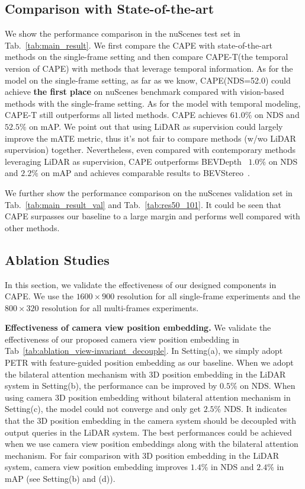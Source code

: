 \documentclass[10pt,twocolumn,letterpaper]{article}
\newcommand{\ourMethod}{CAPE}
\newcommand{\highNDS}{$61.0\%$}
\newcommand{\highmAP}{$52.5\%$}
\begin{document}
\subsection{Comparison with State-of-the-art}
We show the performance comparison in the nuScenes test set in Tab.~\ref{tab:main_result}. We first compare the \ourMethod{} with state-of-the-art methods on the single-frame setting and then compare \ourMethod{}-T(the temporal version of \ourMethod{}) with methods that leverage temporal information. 
As for the model on the single-frame setting, as far as we know, \ourMethod{}(NDS=52.0) could achieve \textbf{the first place} on nuScenes benchmark compared with vision-based methods with the single-frame setting.
As for the model with temporal modeling, \ourMethod{}-T still outperforms all listed methods. \ourMethod{} achieves \highNDS{} on NDS and \highmAP{} on mAP. We point out that using LiDAR as supervision could largely improve the mATE metric, thus it's not fair to compare methods (w/wo LiDAR supervision) together. Nevertheless, even compared with contemporary methods leveraging LiDAR as supervision, \ourMethod{} outperforms BEVDepth~\cite{li2022bevdepth} $1.0\%$ on NDS and $2.2\%$ on mAP and achieves comparable results to BEVStereo~\cite{li2022bevstereo}. 


We further show the performance comparison on the nuScenes validation set in Tab.~\ref{tab:main_result_val} and Tab.~\ref{tab:res50_101}. It could be seen that \ourMethod{} surpasses our baseline to a large margin and performs well compared with other methods. 


\subsection{Ablation Studies} In this section, we validate the effectiveness of our designed components in \ourMethod{}.
We use the $1600 \times 900$ resolution for all single-frame experiments and the $800 \times 320$ resolution for all multi-frames experiments.





\vspace{2mm}
\noindent\textbf{Effectiveness of camera view position embedding.} We validate the effectiveness of our proposed camera view position embedding in Tab~\ref{tab:ablation_view-invariant_decouple}. In Setting(a), we simply adopt PETR with feature-guided position embedding as our baseline. When we adopt the bilateral attention mechanism with 3D position embedding in the LiDAR system in Setting(b), the performance can be improved by $0.5\%$ on NDS. When using camera 3D position embedding without bilateral attention mechanism in Setting(c), the model could not converge and only get $2.5\%$ NDS. It indicates that the 3D position embedding in the camera system should be decoupled with output queries in the LiDAR system. The best performances could be achieved when we use camera view position embeddings along with the bilateral attention mechanism.
For fair comparison with 3D position embedding in the LiDAR system, camera view position embedding improves $1.4\%$ in NDS and $2.4\%$ in mAP (see Setting(b) and (d)).
\end{document}
